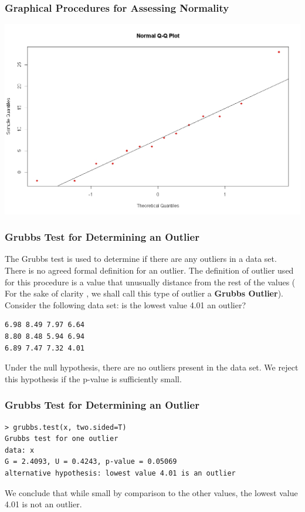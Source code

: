 \documentclass[a4]{beamer}
\begin{document}

\begin{frame}
\frametitle{Graphical Procedures for Assessing Normality}

\begin{center}
\includegraphics[scale=0.32]{10AQQplot}
\end{center}
\end{frame}
\begin{frame}[fragile]
\frametitle{Grubbs Test for Determining an Outlier}

The Grubbs test is used to determine if there are any outliers in a data set.\\ \bigskip
There is no agreed formal definition for an outlier. The definition of outlier used for this procedure is a value that unusually distance from the rest of the values ( For the sake of clarity , we shall call this type of outlier a \textbf{Grubbs Outlier}). Consider the following data set: is the lowest value 4.01 an outlier?
\begin{verbatim}
6.98 8.49 7.97 6.64
8.80 8.48 5.94 6.94
6.89 7.47 7.32 4.01
\end{verbatim}

Under the null hypothesis, there are no outliers present in the data set. 
We reject this hypothesis if the p-value is sufficiently small.
\end{frame}

\begin{frame}[fragile]
\frametitle{Grubbs Test for Determining an Outlier}
\begin{verbatim}
> grubbs.test(x, two.sided=T)
Grubbs test for one outlier
data: x
G = 2.4093, U = 0.4243, p-value = 0.05069
alternative hypothesis: lowest value 4.01 is an outlier
\end{verbatim}
We conclude that while small by comparison to the other values, the lowest value 4.01 is not an outlier.
\end{frame}
\end{document}
